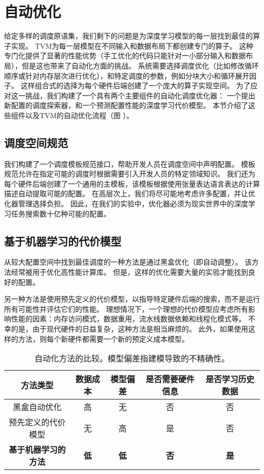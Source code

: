 \section{自动优化}
\label{automating}
给定多样的调度原语集，我们剩下的问题是为深度学习模型的每一层找到最佳的算子实现。
TVM为每一层模型在不同输入和数据布局下都创建专门的算子。
这种专门化提供了显著的性能优势（手工优化的代码只能针对一小部分输入和数据布局），但是这也带来了自动化方面的挑战。
系统需要选择调度优化（比如修改循环顺序或针对内存层次进行优化），和特定调度的参数，例如分块大小和循环展开因子。
这样组合式的选择为每个硬件后端创建了一个庞大的算子实现空间。
为了应对这一挑战，我们构建了一个具有两个主要组件的自动化调度优化器：
一个提出新配置的调度探索器，和一个预测配置性能的深度学习代价模型。
本节介绍了这些组件以及TVM的自动优化流程（图 ）。

\subsection{调度空间规范}
我们构建了一个调度模板规范接口，帮助开发人员在调度空间中声明配置。 
模板规范允许在指定可能的调度时根据需要引入开发人员的特定领域知识。
我们还为每个硬件后端创建了一个通用的主模板，该模板根据使用张量表达语言表达的计算描述自动提取可能的配置。
在高层次上，我们将尽可能地考虑许多配置，并让优化器管理选择负担。
因此，在我们的实验中，优化器必须为现实世界中的深度学习任务搜索数十亿种可能的配置。

\subsection{基于机器学习的代价模型}
从较大配置空间中找到最佳调度的一种方法是通过黑盒优化（即自动调整）。
该方法经常被用于优化高性能计算库。
但是，这样的优化需要大量的实验才能找到良好的配置。

另一种方法是使用预先定义的代价模型，以指导特定硬件后端的搜索，而不是运行所有可能性并评估它们的性能。
理想情况下，一个理想的代价模型应考虑所有影响性能的因素：内存访问模式，数据重用，流水线数据依赖和线程化模式等。
不幸的是，由于现代硬件的日益复杂，这种方法是相当麻烦的。
此外，如果使用这样的方法，则每个新硬件都需要一个新的预定义成本模型。

\begin{table}[htbp]
\small
\begin{tabular}{ccccc}
    \hline
    方法类型 & 数据成本 & 模型偏差 & 是否需要硬件信息 & 是否学习历史数据 \\
    \hline
    黑盒自动优化 & 高 & 无 & 否 & 否 \\
    预先定义的代价模型 & 无 & 高 & 是 & 否 \\
    \textbf{基于机器学习的方法} & \textbf{低} & \textbf{低} & \textbf{否} & \textbf{是} \\
    \hline
\end{tabular}
\caption{\label{tab:methods}自动化方法的比较。模型偏差指建模导致的不精确性。}
\end{table}


